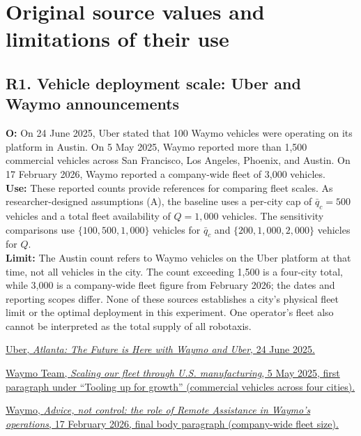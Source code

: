 \documentclass[10pt,a4paper]{article}
\begin{document}
\section{Original source values and limitations of their use}

\subsection*{\hypertarget{rationale-R1}{R1. Vehicle deployment scale: Uber and Waymo announcements}}

\textbf{O:} On 24 June 2025, Uber stated that 100 Waymo vehicles were operating on its platform in Austin. On 5 May 2025, Waymo reported more than 1,500 commercial vehicles across San Francisco, Los Angeles, Phoenix, and Austin. On 17 February 2026, Waymo reported a company-wide fleet of 3,000 vehicles. \\
\textbf{Use:} These reported counts provide references for comparing fleet scales. As researcher-designed assumptions (A), the baseline uses a per-city cap of $\bar q_c=500$ vehicles and a total fleet availability of $Q=1{,}000$ vehicles. The sensitivity comparisons use $\{100,500,1{,}000\}$ vehicles for $\bar q_c$ and $\{200,1{,}000,2{,}000\}$ vehicles for $Q$. \\
\textbf{Limit:} The Austin count refers to Waymo vehicles on the Uber platform at that time, not all vehicles in the city. The count exceeding 1,500 is a four-city total, while 3,000 is a company-wide fleet figure from February 2026; the dates and reporting scopes differ. None of these sources establishes a city's physical fleet limit or the optimal deployment in this experiment. One operator's fleet also cannot be interpreted as the total supply of all robotaxis.

\par\href{https://investor.uber.com/news-events/news/press-release-details/2025/Atlanta-The-Future-is-Here-with-Waymo-and-Uber-2025-y1tuDCCSgu/default.aspx}{Uber, \textit{Atlanta: The Future is Here with Waymo and Uber}, 24 June 2025.}

\par\href{https://waymo.com/blog/2025/05/scaling-our-fleet-through-us-manufacturing/#:~:text=over\%201\%2C500\%20vehicles}{Waymo Team, \textit{Scaling our fleet through U.S. manufacturing}, 5 May 2025, first paragraph under ``Tooling up for growth'' (commercial vehicles across four cities).}

\par\href{https://waymo.com/blog/shorts/advice-not-control-the-role-of-remote-assistance/#:~:text=fleet\%20of\%203\%2C000\%20vehicles}{Waymo, \textit{Advice, not control: the role of Remote Assistance in Waymo's operations}, 17 February 2026, final body paragraph (company-wide fleet size).}
\end{document}
